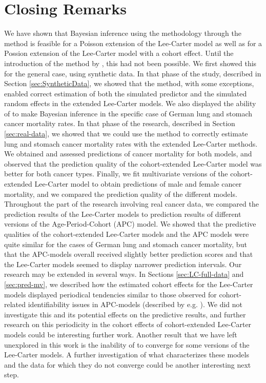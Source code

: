 \section{Closing Remarks}
\label{sec:closingRemarks}
We have shown that Bayesian inference using the \INLA methodology through the \inlabru method is feasible for a Poisson extension of the Lee-Carter model as well as for a Possion extension of the Lee-Carter model with a cohort effect. Until the introduction of the \inlabru method by \textcite{BachlLindgren2019}, this had not been possible. We first showed this for the general case, using synthetic data. In that phase of the study, described in Section \ref{sec:SyntheticData}, we showed that the \inlabru method, with some exceptions, enabled correct estimation of both the simulated predictor and the simulated random effects in the extended Lee-Carter models. We also displayed the ability of \inlabru to make Bayesian inference in the specific case of German lung and stomach cancer mortality rates. In that phase of the research, described in Section \ref{sec:real-data}, we showed that we could use the \inlabru method to correctly estimate lung and stomach cancer mortality rates with the extended Lee-Carter methods. We obtained and assessed predictions of cancer mortality for both models, and observed that the prediction quality of the cohort-extended Lee-Carter model was better for both cancer types. Finally, we fit multivariate versions of the cohort-extended Lee-Carter model to obtain predictions of male and female cancer mortality, and we compared the prediction quality of the different models. Throughout the part of the research involving real cancer data, we compared the prediction results of the Lee-Carter models to prediction results of different versions of the Age-Period-Cohort (APC) model. We showed that the predictive qualities of the cohort-extended Lee-Carter models and the APC models were quite similar for the cases of German lung and stomach cancer mortality, but that the APC-models overall received slightly better prediction scores and that the Lee-Carter models seemed to display narrower prediction intervals.     
\newpar Our research may be extended in several ways. In Sections \ref{sec:LC-full-data} and \ref{sec:pred-mv}, we described how the estimated cohort effects for the Lee-Carter models displayed periodical tendencies similar to those observed for cohort-related identifiability issues in APC-models (described by e.g. \textcite{RieblerThesis2010}). We did not investigate this and its potential effects on the predictive results, and further research on this periodicity in the cohort effects of cohort-extended Lee-Carter models could be interesting further work. Another result that we have left unexplored in this work is the inability of \inlabru to converge for some versions of the Lee-Carter models. A further investigation of what characterizes these models and the data for which they do not converge could be another interesting next step. 

